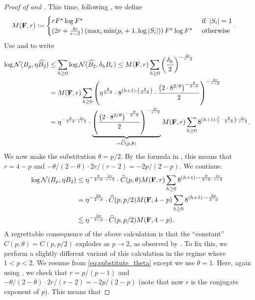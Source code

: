\documentclass[11pt]{article}
\numberwithin{equation}{section}
\begin{document}
\begin{proof}[Proof of  and ]
This time, following , we define
\begin{align*}
    M(\mathbf{F},r) &\coloneqq \begin{cases} rF^{\star}\log F^{\star} & \text{ if } \left\lvert S_i \right\rvert=1 \\ (2r + \frac{4r}{r-2})\left(\max_i \min(p_i+1, \log\left\lvert S_i \right\rvert)\right)F^{\star}\log F^{\star} & \text{ otherwise} \end{cases}.
\end{align*}
Use  and  to write
\begin{align}
    \log\mathcal{N}(B_p,\eta \widehat{B_2}) &\le \sum_{h\ge 0} \log\mathcal{N}(\widehat{B_2},\delta_hB_r) \le M(\mathbf{F},r)\sum_{h \ge 0} \left(\frac{\delta_h}{2}\right)^{-\frac{2r}{r-2}}\nonumber \\
    &= M(\mathbf{F},r) \sum_{h \ge 0} \left(\eta^{\frac{\theta}{2-\theta}}\cdot 8^{(h+1)\cdot\left(\frac{\theta}{2-\theta}\right)} \cdot \frac{\left(2\cdot 8^{2/\theta}\right)^{-\frac{\theta}{2-\theta}}}{2}\right)^{-\frac{2r}{r-2}} \nonumber \\
    &= \eta^{-\frac{\theta}{2-\theta}\cdot\frac{2r}{r-2}} \cdot \underbrace{\left(\frac{\left(2\cdot 8^{2/\theta}\right)^{-\frac{\theta}{2-\theta}}}{2}\right)^{-\frac{2r}{r-2}}}_{= \widehat{C}(p,\theta)} M(\mathbf{F},r)\sum_{h \ge 0} 8^{(h+1) \cdot \left(-\frac{\theta}{2-\theta}\right)\cdot\frac{2r}{r-2}} \label{eq:substitute_theta}.
\end{align}
We now make the substitution $\theta=p/2$. By the formula in , this means that $r = 4-p$ and $-\theta/(2-\theta) \cdot 2r/(r-2) = -2p/(2-p)$. We continue.
\begin{align*}
    \log\mathcal{N}(B_p,\eta B_2) &\le \eta^{-\frac{\theta}{2-\theta}\cdot\frac{2r}{r-2}} \cdot \widehat{C}(p,\theta) M(\mathbf{F},r)\sum_{h \ge 0} 8^{(h+1) \cdot -\frac{\theta}{2-\theta}\cdot\frac{2r}{r-2}} \\
    &= \eta^{-\frac{2p}{2-p}} \cdot \widehat{C}(p,p/2) M(\mathbf{F},4-p)\sum_{h \ge 0} 8^{(h+1) \cdot -\frac{2p}{2-p}} \\
    &\lesssim \eta^{-\frac{2p}{2-p}} \cdot \widehat{C}(p,p/2) M(\mathbf{F},4-p).
\end{align*}
A regrettable consequence of the above calculation is that the ``constant'' $C(p,\theta)=C(p,p/2)$ explodes as $p\rightarrow 2$, as observed by \citet{sz01}. To fix this, we perform a slightly different variant of this calculation in the regime where $1 < p < 2$. We resume from \eqref{eq:substitute_theta} except we use $\theta = 1$. Here, again using , we check that $r=p/(p-1)$ and $-\theta/(2-\theta) \cdot 2r/(r-2) = -2p/(2-p)$ (note that now $r$ is the conjugate exponent of $p$). This means that

\end{proof}
\end{document}
